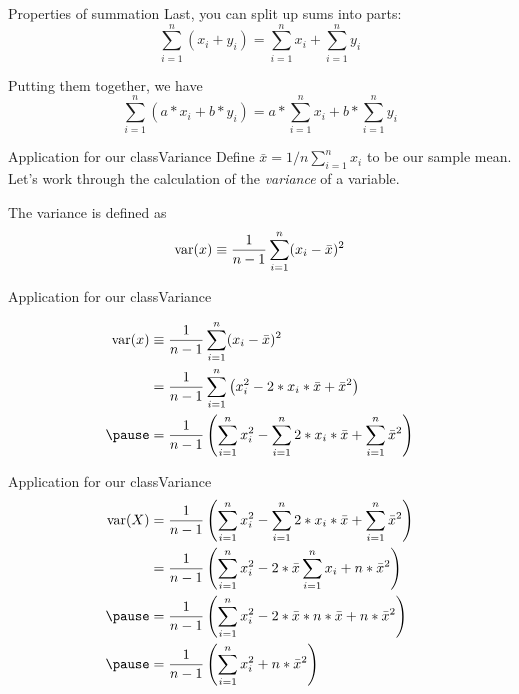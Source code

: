 \documentclass[aspectratio=169,t,11pt,table]{beamer}
\begin{document}
\begin{frame}{Properties of summation}
  Last, you can split up sums into parts:
  \begin{equation*}
    \sum_{i=1}^n (x_i + y_i) = \sum_{i=1}^n x_i + \sum_{i=1}^n y_i
  \end{equation*}

  \pause
  \bigskip
  Putting them together, we have 
  \begin{equation*}
    \sum_{i=1}^n (a*x_i + b*y_i) = a * \sum_{i=1}^n x_i + b * \sum_{i=1}^n y_i
  \end{equation*}
\end{frame}
  
\begin{frame}{Application for our class}{Variance}
  Define $\bar{x} = 1/n \sum_{i=1}^n x_i$ to be our sample mean. Let's work through the calculation of the \emph{variance} of a variable. 
  
  \bigskip 
  The variance is defined as
  $$ 
    \var(x) \equiv \frac{1}{n-1} \sum_{i=1}^n (x_i - \bar{x})^2 
  $$
\end{frame}

\begin{frame}{Application for our class}{Variance}
  \vspace*{-10mm}
  
  \begin{align*}
    \var(x) &\equiv \frac{1}{n-1} \sum_{i=1}^n (x_i - \bar{x})^2 \\
    &= \frac{1}{n-1} \sum_{i=1}^n \left( x_i^2 - 2 * x_i * \bar{x} + \bar{x}^2\right) \\
    \pause
    &= \frac{1}{n-1} \left( \sum_{i=1}^n x_i^2 - \sum_{i=1}^n 2 * x_i * \bar{x} + \sum_{i=1}^n \bar{x}^2 \right)
  \end{align*}
\end{frame}

\begin{frame}{Application for our class}{Variance}
  \vspace*{-10mm}
    \begin{align*}
      \var(X) &= \frac{1}{n-1} \left( \sum_{i=1}^n x_i^2 - \sum_{i=1}^n 2 * x_i * \bar{x} + \sum_{i=1}^n \bar{x}^2 \right) \\
      &= \frac{1}{n-1} \left( \sum_{i=1}^n x_i^2 - 2 * \bar{x} \sum_{i=1}^n x_i + n * \bar{x}^2 \right) \\
      \pause
      &= \frac{1}{n-1} \left( \sum_{i=1}^n x_i^2 - 2 * \bar{x} * n * \bar{x} + n * \bar{x}^2 \right) \\
      \pause
      &= \frac{1}{n-1} \left( \sum_{i=1}^n x_i^2 + n * \bar{x}^2 \right)
    \end{align*}
\end{frame}
\end{document}
